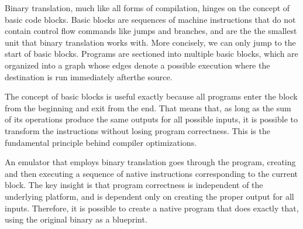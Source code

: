 Binary translation, much like all forms of compilation, hinges on the concept
of basic code blocks.  Basic blocks are sequences of machine instructions that
do not contain control flow commands like jumps and branches, and are the the
smallest unit that binary translation works with.  More concisely, we can only
jump to the start of basic blocks. Programs are sectioned into multiple basic
blocks, which are organized into a graph whose edges denote a possible execution
where the destination is run immediately afterthe source. 

The concept of basic blocks is useful exactly because all programs enter the 
block from the beginning and exit from the end. That means that, as long as
the sum of its operations produce the same outputs for all possible inputs,
it is possible to transform the instructions without losing program correctness.
This is the fundamental principle behind compiler optimizations.

An emulator that employs binary translation goes through the program, creating and 
then executing a sequence of native instructions corresponding to the current block.
The key insight is that program correctness is independent of the underlying
platform, and is dependent only on creating the proper output for all inputs.
Therefore, it is possible to create a native program that does exactly that, using 
the original binary as a blueprint.




